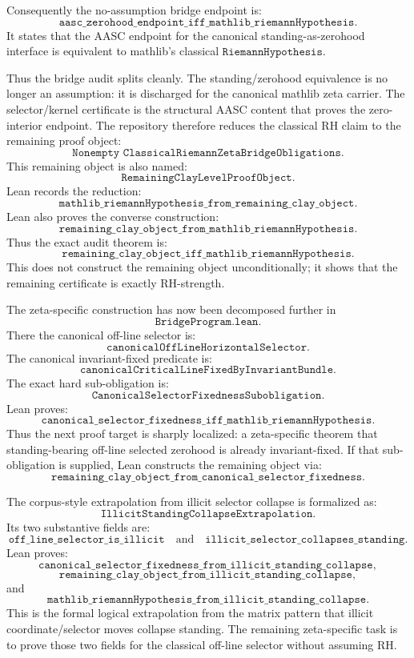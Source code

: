 \documentclass[11pt]{article}
\begin{document}
Consequently the no-assumption bridge endpoint is:
\[
\texttt{aasc\_zerohood\_endpoint\_iff\_mathlib\_riemannHypothesis}.
\]
It states that the AASC endpoint for the canonical standing-as-zerohood
interface is equivalent to mathlib's classical
\(\texttt{RiemannHypothesis}\).

Thus the bridge audit splits cleanly.  The standing/zerohood equivalence is no
longer an assumption: it is discharged for the canonical mathlib zeta carrier.
The selector/kernel certificate is the structural AASC content that proves the
zero-interior endpoint.  The repository therefore reduces the classical RH
claim to the remaining proof object:
\[
\texttt{Nonempty ClassicalRiemannZetaBridgeObligations}.
\]
This remaining object is also named:
\[
\texttt{RemainingClayLevelProofObject}.
\]
Lean records the reduction:
\[
\texttt{mathlib\_riemannHypothesis\_from\_remaining\_clay\_object}.
\]
Lean also proves the converse construction:
\[
\texttt{remaining\_clay\_object\_from\_mathlib\_riemannHypothesis}.
\]
Thus the exact audit theorem is:
\[
\texttt{remaining\_clay\_object\_iff\_mathlib\_riemannHypothesis}.
\]
This does not construct the remaining object unconditionally; it shows that
the remaining certificate is exactly RH-strength.

The zeta-specific construction has now been decomposed further in
\[
\texttt{BridgeProgram.lean}.
\]
There the canonical off-line selector is:
\[
\texttt{canonicalOffLineHorizontalSelector}.
\]
The canonical invariant-fixed predicate is:
\[
\texttt{canonicalCriticalLineFixedByInvariantBundle}.
\]
The exact hard sub-obligation is:
\[
\texttt{CanonicalSelectorFixednessSubobligation}.
\]
Lean proves:
\[
\texttt{canonical\_selector\_fixedness\_iff\_mathlib\_riemannHypothesis}.
\]
Thus the next proof target is sharply localized: a zeta-specific theorem that
standing-bearing off-line selected zerohood is already invariant-fixed.  If
that sub-obligation is supplied, Lean constructs the remaining object via:
\[
\texttt{remaining\_clay\_object\_from\_canonical\_selector\_fixedness}.
\]

The corpus-style extrapolation from illicit selector collapse is formalized as:
\[
\texttt{IllicitStandingCollapseExtrapolation}.
\]
Its two substantive fields are:
\[
\texttt{off\_line\_selector\_is\_illicit}
\quad\text{and}\quad
\texttt{illicit\_selector\_collapses\_standing}.
\]
Lean proves:
\[
\texttt{canonical\_selector\_fixedness\_from\_illicit\_standing\_collapse},
\]
\[
\texttt{remaining\_clay\_object\_from\_illicit\_standing\_collapse},
\]
and
\[
\texttt{mathlib\_riemannHypothesis\_from\_illicit\_standing\_collapse}.
\]
This is the formal logical extrapolation from the matrix pattern that illicit
coordinate/selector moves collapse standing.  The remaining zeta-specific task
is to prove those two fields for the classical off-line selector without
assuming RH.
\end{document}
